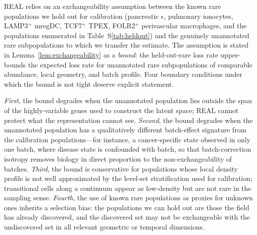REAL relies on an exchangeability assumption between the known rare populations we hold out for calibration (pancreatic $\epsilon$, pulmonary ionocytes, LAMP3$^+$ mregDC, TCF7$^+$ TPEX, FOLR2$^+$ perivascular macrophages, and the populations enumerated in Table~S\ref{tab:heldout}) and the genuinely unannotated rare subpopulations to which we transfer the estimate. The assumption is stated in Lemma~\ref{lem:exchangeability} as a \emph{bound}: the held-out-rare loss rate upper-bounds the expected loss rate for unannotated rare subpopulations of comparable abundance, local geometry, and batch profile. Four boundary conditions under which the bound is not tight deserve explicit statement.

\textit{First}, the bound degrades when the unannotated population lies outside the span of the highly-variable genes used to construct the latent space; REAL cannot protect what the representation cannot see. \textit{Second}, the bound degrades when the unannotated population has a qualitatively different batch-effect signature from the calibration populations---for instance, a cancer-specific state observed in only one batch, where disease state is confounded with batch, so that batch-correction isotropy removes biology in direct proportion to the non-exchangeability of batches. \textit{Third}, the bound is conservative for populations whose local density profile is not well approximated by the level-set stratification used for calibration; transitional cells along a continuum appear as low-density but are not rare in the sampling sense. \textit{Fourth}, the use of known rare populations as proxies for unknown ones inherits a selection bias: the populations we can hold out are those the field has already discovered, and the discovered set may not be exchangeable with the undiscovered set in all relevant geometric or temporal dimensions.

